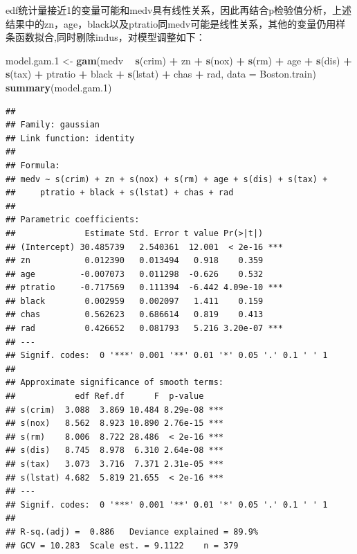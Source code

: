 \documentclass[UTF-8]{ctexart}
\newenvironment{Shaded}{\begin{snugshade}}{\end{snugshade}}
\newcommand{\DataTypeTok}[1]{\textcolor[rgb]{0.13,0.29,0.53}{#1}}
\newcommand{\FloatTok}[1]{\textcolor[rgb]{0.00,0.00,0.81}{#1}}
\newcommand{\KeywordTok}[1]{\textcolor[rgb]{0.13,0.29,0.53}{\textbf{#1}}}
\newcommand{\NormalTok}[1]{#1}
\newcommand{\OperatorTok}[1]{\textcolor[rgb]{0.81,0.36,0.00}{\textbf{#1}}}
\newcommand{\StringTok}[1]{\textcolor[rgb]{0.31,0.60,0.02}{#1}}
\begin{document}
edf统计量接近1的变量可能和medv具有线性关系，因此再结合p检验值分析，上述结果中的zn，age，black以及ptratio同medv可能是线性关系，其他的变量仍用样条函数拟合,同时剔除indus，对模型调整如下：

\begin{Shaded}
	\begin{Highlighting}[]
\NormalTok{model.gam}\FloatTok{.1}\NormalTok{ <-}\StringTok{ }\KeywordTok{gam}\NormalTok{(medv }\OperatorTok{~}\StringTok{ }\KeywordTok{s}\NormalTok{(crim) }\OperatorTok{+}\StringTok{ }\NormalTok{zn  }\OperatorTok{+}\StringTok{ }\KeywordTok{s}\NormalTok{(nox) }\OperatorTok{+}
\StringTok{                   }\KeywordTok{s}\NormalTok{(rm) }\OperatorTok{+}\StringTok{ }\NormalTok{age }\OperatorTok{+}\StringTok{ }\KeywordTok{s}\NormalTok{(dis) }\OperatorTok{+}\StringTok{ }
\StringTok{                   }\KeywordTok{s}\NormalTok{(tax) }\OperatorTok{+}\StringTok{ }\NormalTok{ptratio }\OperatorTok{+}\StringTok{ }\NormalTok{black }\OperatorTok{+}\StringTok{ }
\StringTok{                   }\KeywordTok{s}\NormalTok{(lstat) }\OperatorTok{+}\StringTok{ }\NormalTok{chas }\OperatorTok{+}\StringTok{ }\NormalTok{rad, }\DataTypeTok{data =}\NormalTok{ Boston.train)}
\KeywordTok{summary}\NormalTok{(model.gam}\FloatTok{.1}\NormalTok{)}
	\end{Highlighting}
\end{Shaded}

\begin{verbatim}
## 
## Family: gaussian 
## Link function: identity 
## 
## Formula:
## medv ~ s(crim) + zn + s(nox) + s(rm) + age + s(dis) + s(tax) + 
##     ptratio + black + s(lstat) + chas + rad
## 
## Parametric coefficients:
##              Estimate Std. Error t value Pr(>|t|)    
## (Intercept) 30.485739   2.540361  12.001  < 2e-16 ***
## zn           0.012390   0.013494   0.918    0.359    
## age         -0.007073   0.011298  -0.626    0.532    
## ptratio     -0.717569   0.111394  -6.442 4.09e-10 ***
## black        0.002959   0.002097   1.411    0.159    
## chas         0.562623   0.686614   0.819    0.413    
## rad          0.426652   0.081793   5.216 3.20e-07 ***
## ---
## Signif. codes:  0 '***' 0.001 '**' 0.01 '*' 0.05 '.' 0.1 ' ' 1
## 
## Approximate significance of smooth terms:
##            edf Ref.df      F  p-value    
## s(crim)  3.088  3.869 10.484 8.29e-08 ***
## s(nox)   8.562  8.923 10.890 2.76e-15 ***
## s(rm)    8.006  8.722 28.486  < 2e-16 ***
## s(dis)   8.745  8.978  6.310 2.64e-08 ***
## s(tax)   3.073  3.716  7.371 2.31e-05 ***
## s(lstat) 4.682  5.819 21.655  < 2e-16 ***
## ---
## Signif. codes:  0 '***' 0.001 '**' 0.01 '*' 0.05 '.' 0.1 ' ' 1
## 
## R-sq.(adj) =  0.886   Deviance explained = 89.9%
## GCV = 10.283  Scale est. = 9.1122    n = 379
\end{verbatim}
\end{document}
